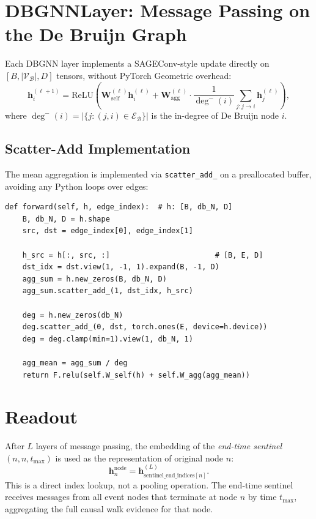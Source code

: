 \documentclass[12pt,a4paper]{report}
\newcommand{\bh}{\mathbf{h}}
\newcommand{\bW}{\mathbf{W}}
\newcommand{\calV}{\mathcal{V}}
\newcommand{\calE}{\mathcal{E}}
\newcommand{\calB}{\mathcal{B}}
\begin{document}
\section{DBGNNLayer: Message Passing on the De Bruijn Graph}

Each DBGNN layer implements a SAGEConv-style update directly on $[B, |\calV_\calB|, D]$
tensors, without PyTorch Geometric overhead:
\begin{equation}
  \bh_i^{(\ell+1)} = \text{ReLU}\!\left(\bW_{\text{self}}^{(\ell)} \bh_i^{(\ell)} + \bW_{\text{agg}}^{(\ell)} \cdot \frac{1}{\deg^-(i)} \sum_{j : j \to i} \bh_j^{(\ell)}\right),
  \label{eq:db_layer}
\end{equation}
where $\deg^-(i) = |\{j : (j,i) \in \calE_\calB\}|$ is the in-degree of De
Bruijn node $i$.

\subsection{Scatter-Add Implementation}

The mean aggregation is implemented via \texttt{scatter\_add\_} on a preallocated
buffer, avoiding any Python loops over edges:
\begin{lstlisting}[caption={DBGNNLayer forward (from \texttt{gnn/dbgnn.py}).}]
def forward(self, h, edge_index):  # h: [B, db_N, D]
    B, db_N, D = h.shape
    src, dst = edge_index[0], edge_index[1]

    h_src = h[:, src, :]                        # [B, E, D]
    dst_idx = dst.view(1, -1, 1).expand(B, -1, D)
    agg_sum = h.new_zeros(B, db_N, D)
    agg_sum.scatter_add_(1, dst_idx, h_src)

    deg = h.new_zeros(db_N)
    deg.scatter_add_(0, dst, torch.ones(E, device=h.device))
    deg = deg.clamp(min=1).view(1, db_N, 1)

    agg_mean = agg_sum / deg
    return F.relu(self.W_self(h) + self.W_agg(agg_mean))
\end{lstlisting}

\section{Readout}

After $L$ layers of message passing, the embedding of the \emph{end-time
sentinel} $(n, n, t_{\max})$ is used as the representation of original node $n$:
\begin{equation}
  \bh_n^{\text{node}} = \bh_{\text{sentinel\_end\_indices}[n]}^{(L)}.
  \label{eq:db_readout}
\end{equation}
This is a direct index lookup, not a pooling operation. The end-time sentinel
receives messages from all event nodes that terminate at node $n$ by time
$t_{\max}$, aggregating the full causal walk evidence for that node.
\end{document}
